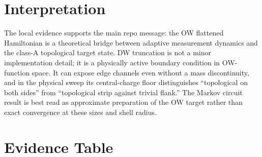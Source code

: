 \documentclass[aps,prb,onecolumn,nofootinbib,superscriptaddress]{revtex4-2}
\begin{document}
\section{Interpretation}

The local evidence supports the main repo message: the OW flattened Hamiltonian is a theoretical bridge between adaptive measurement dynamics and the class-A topological target state. DW truncation is not a minor implementation detail; it is a physically active boundary condition in OW-function space. It can expose edge channels even without a mass discontinuity, and in the physical sweep its central-charge floor distinguishes ``topological on both sides'' from ``topological strip against trivial flank.'' The Markov circuit result is best read as approximate preparation of the OW target rather than exact convergence at these sizes and shell radius.

\section{Evidence Table}
\end{document}
